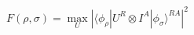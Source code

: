 \begin{equation}
	F(\rho,\sigma) = \max_U | \langle \phi_\rho |  U^R \otimes I^A | \phi_\sigma \rangle^{RA} |^2
\end{equation}